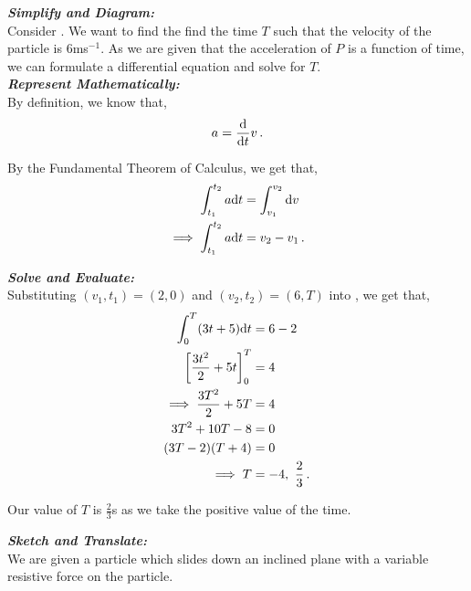 \begin{subquestions}
\textbf{\textit{Simplify and Diagram:}} \\
Consider . We want to find the find the time $T$ such that the velocity of the particle is 6ms$^{-1}$. As we are given that the acceleration of $P$ is a function of time, we can formulate a differential equation and solve for $T$.\\




\textbf{\textit{Represent Mathematically:}} \\
By definition, we know that,
\begin{equation}
	a = \frac{\mathrm{d}}{\mathrm{d}t}v \,.
\end{equation}

By the Fundamental Theorem of Calculus, we get that,
\begin{align}
	\int_{t_1}^{t_2}a \mathrm{d} t & = \int_{v_1}^{v_2} \mathrm{d} v \nonumber \\
	\implies \int_{t_1}^{t_2}a \mathrm{d} t & = v_2-v_1 \,. \label{2014:q6:FTC1}
\end{align}




\textbf{\textit{Solve and Evaluate:}} \\
Substituting $(v_1,t_1)=(2,0)$ and $(v_2,t_2)=(6,T)$ into , we get that,
\begin{align}
	\int_{0}^{T} (3t+5) \mathrm{d} t & = 6-2 \nonumber \\
	\left[\frac{3t^2}{2} +5t \right]^T_0 & = 4 \nonumber \\
	\implies \frac{3T^2}{2} +5T & = 4 \nonumber \\
	3T^2 +10T-8 & = 0 \nonumber \\
	(3T-2)(T+4) & = 0 \nonumber \\
	\implies T & = -4,~\frac{2}{3} \,.
\end{align}

Our value of $T$ is $\frac{2}{3}$s as we take the positive value of the time. 


\subquestion

\textbf{\textit{Sketch and Translate:}} \\
We are given a particle which slides down an inclined plane with a variable resistive force on the particle.\\





\end{subquestions}
